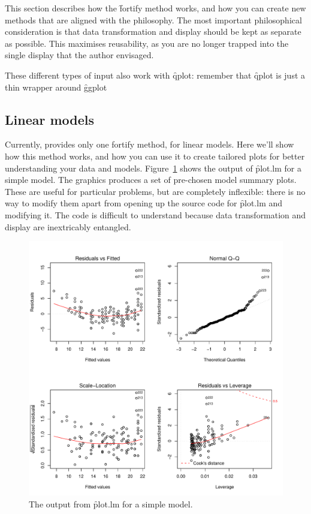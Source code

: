 {This section describes how the \f{fortify} method works, and how you can create new methods that are aligned with the \ggplot philosophy.  The most important philosophical consideration is that data transformation and display should be kept as separate as possible.  This maximises reusability, as you are no longer trapped into the single display that the author envisaged.  

These different types of input also work with \f{qplot}: remember that \f{qplot} is just a thin wrapper around \f{ggplot}

\subsection{Linear models}

Currently, \ggplot provides only one fortify method, for linear models. Here we'll show how this method works, and how you can use it to create tailored plots for better understanding your data and models. Figure~\ref{fig:plot-lm} shows the output of \f{plot.lm} for a simple model. The graphics produces a set of pre-chosen model summary plots. These are useful for particular problems, but are completely inflexible: there is no way to modify them apart from opening up the source code for \f{plot.lm} and modifying it. The code is difficult to understand because data transformation and display are inextricably entangled.


\begin{figure}[htbp]
  \centering
  \includegraphics[width=0.8\linewidth]{data-plot-lm}
  \caption{The output from \f{plot.lm} for a simple model.  }
  \label{fig:plot-lm}
\end{figure}

}
